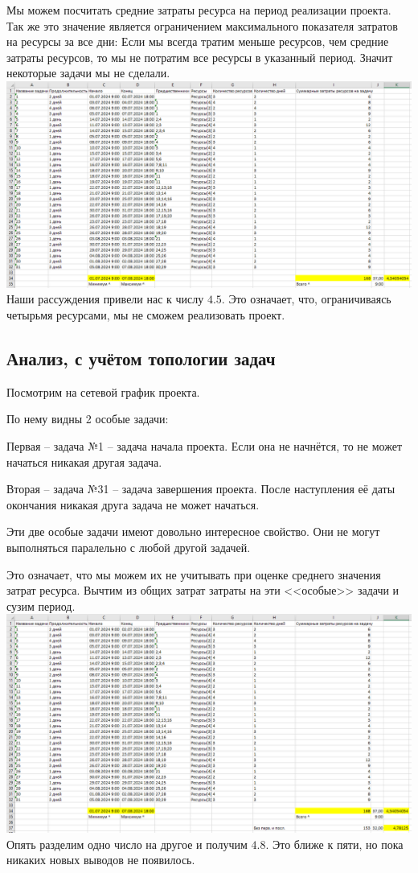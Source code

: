 \documentclass[14pt]{article}
\begin{document}
		Мы можем посчитать средние затраты ресурса на период реализации проекта.
		Так же это значение является ограничением максимального показателя затратов на ресурсы за все дни:
		Если мы всегда тратим меньше ресурсов, чем средние затраты ресурсов, то мы не потратим все ресурсы в указанный период.
		Значит некоторые задачи мы не сделали.\\
		\includegraphics[width=\textwidth]{../img/1a1_time_estimation.png}\\
		Наши рассуждения привели нас к числу $4.5$.
		Это означает, что, ограничиваясь четырьмя ресурсами, мы не сможем реализовать проект.
	\subsection{Анализ, с учётом топологии задач}
		Посмотрим на сетевой график проекта.
		
		По нему видны 2 особые задачи:
		
		Первая -- задача №1 -- задача начала проекта.
		Если она не начнётся, то не может начаться никакая другая задача.
		
		Вторая -- задача №31 -- задача завершения проекта.
		После наступления её даты окончания никакая друга задача не может начаться.
		
		Эти две особые задачи имеют довольно интересное свойство.
		Они не могут выполняться паралельно с любой другой задачей.
		
		Это означает, что мы можем их не учитывать при оценке среднего значения затрат ресурса.
		Вычтим из общих затрат затраты на эти <<особые>> задачи и сузим период.\\
		\includegraphics[width=\textwidth]{../img/1a2_time_estimation.png}\\ 
		Опять разделим одно число на другое и получим $4.8$.
		Это ближе к пяти, но пока никаких новых выводов не появилось.
\end{document}
